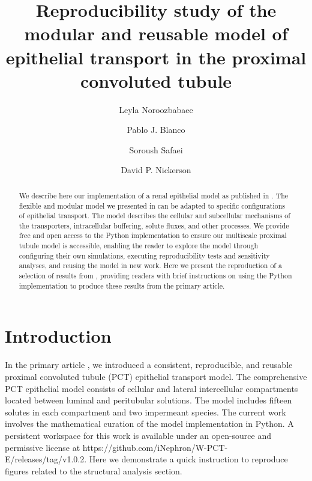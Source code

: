 \documentclass[fleqn,10pt]{physiome}
\title{Reproducibility study of the modular and reusable model of epithelial transport in the proximal convoluted tubule}
\author[1][l.noroozbabaee@auckland.ac.nz]{Leyla Noroozbabaee}
\author[2] {Pablo J. Blanco}
\author[1] {Soroush Safaei}
\author[1] {David P. Nickerson}
\affil[1]{Auckland Bioengineering Institute, University of Auckland, New Zealand}
\affil[2]{National Laboratory for Scientific Computing, Petrópolis, Brazil}
\begin{document}
\maketitle
\begin{abstract}
We describe here our implementation of a renal epithelial model as published in \cite{noroozbabaee2022modular}. The flexible and modular model we presented in \cite{noroozbabaee2022modular} can be adapted to specific configurations of epithelial transport. The model describes the cellular and subcellular mechanisms of the transporters, intracellular buffering, solute fluxes, and other processes. We provide free and open access to the Python implementation to ensure our multiscale proximal tubule model is accessible, enabling the reader to explore the model through configuring their own simulations, executing reproducibility tests and sensitivity analyses, and reusing the model in new work.
Here we present the reproduction of a selection of results from \cite{noroozbabaee2022modular}, providing readers with brief instructions on using the Python implementation to produce these results from the primary article.
\end{abstract}


\section{Introduction}
 In the primary article \citep{noroozbabaee2022modular}, we introduced a consistent, reproducible, and reusable proximal convoluted tubule (PCT) epithelial transport model. The comprehensive PCT epithelial model consists of cellular and lateral intercellular compartments located between luminal and peritubular solutions. The model includes fifteen solutes in each compartment and two impermeant species. The current work involves the mathematical curation of the model implementation in Python. A persistent workspace for this work is available under an open-source and permissive license at https://github.com/iNephron/W-PCT-E/releases/tag/v1.0.2.  
Here we demonstrate a quick instruction to reproduce figures related to the structural analysis section.
\end{document}
